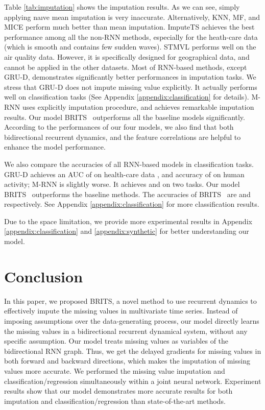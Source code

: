 \documentclass{article}
\newcommand{\brits}{\xspace{BRITS}}
\newcommand{\methodname}{\xspace{BRITS}}
\begin{document}
Table \ref{tab:imputation} shows the imputation results. 
As we can see, simply applying na\i ve mean imputation is very inaccurate. Alternatively, KNN, MF, and MICE perform much better than mean imputation. ImputeTS achieves the best performance among all the non-RNN methods, especially for the heath-care data (which is smooth and contains few sudden waves). STMVL performs well on the air quality data. However, it is specifically designed for geographical data, and cannot be applied in the other datasets. Most of RNN-based methods, except GRU-D, demonstrates significantly better performances in imputation tasks. We stress that GRU-D does not impute missing value explicitly. It actually performs well on classification tasks (See Appendix \ref{appendix:classification} for details).
 M-RNN uses explicitly imputation procedure, and achieves remarkable imputation results.  Our model \brits~ outperforms all the baseline models significantly. According to the performances of our four models, we also find that both bidirectional recurrent dynamics, and the feature correlations are helpful to enhance the model performance.

We also compare the accuracies of all RNN-based models in classification tasks.
GRU-D achieves an AUC of  on health-care data , and accuracy  of  on human activity; M-RNN is slightly worse. It achieves  and  on two tasks. Our model \brits~ outperforms the baseline methods. The accuracies of \brits~ are  and  respectively. See Appendix \ref{appendix:classification} for more classification results.

Due to the space limitation, we provide more experimental results in Appendix \ref{appendix:classification} and \ref{appendix:synthetic} for better understanding our model.









%
 
\section{Conclusion}
\label{sec:conclusion}
In this paper, we proposed \methodname, a novel method to use recurrent dynamics to effectively impute the missing values in multivariate time series. Instead of imposing assumptions over the data-generating process, our model directly learns the missing values in a bidirectional recurrent dynamical system, without any specific assumption. Our model treats missing values as variables of the bidirectional RNN graph. Thus, we get the delayed gradients for missing values in both forward and backward directions, which makes the imputation of missing values more accurate. We performed the missing value imputation and classification/regression simultaneously within a joint neural network. Experiment results show that our model demonstrates more accurate results for both imputation and classification/regression than state-of-the-art methods. 


\newpage
\appendix
\end{document}
